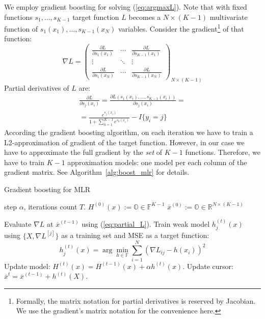 \documentclass{article}
\begin{document}
We employ gradient boosting for solving (\ref{eq:argmaxL}).
Note that with fixed functions $s_1,\ldots,s_{K-1}$ target function $L$ becomes a $N\times(K-1)$ multivariate function of $s_1(x_1),\ldots,s_{K-1}(x_N)$ variables. Consider the gradient\footnote{Formally, the matrix notation for partial derivatives is reserved by Jacobian. We use the gradient's matrix notation for the convenience here.} of that function:
\[
\nabla L = 
\left(
\begin{array}{ccc}
	  \frac{ \partial L }{ \partial s_{1}(x_{1}) } 
	& \cdots 
	& \frac{ \partial L }{ \partial s_{K-1}(x_{1}) } \\

	  \vdots & \ddots & \vdots\\

	  \frac{ \partial L }{ \partial s_{1}(x_{N}) } 
	& \cdots 
	& \frac{ \partial L }{ \partial s_{K-1}(x_{N}) }
\end{array}
\right)_{N \times (K-1)}
\]
Partial derivatives of $L$ are:
\begin{multline}
\frac{ \partial L }{ \partial s_{j}(x_{i}) }=
\frac{ \partial L(s_{1}(x_{i}),\dots,s_{K-1}(x_{i})) }{ \partial s_{j}(x_{i}) }= \\ =
\frac{ e^{s_{j}(x_{i})} }{ 1+\sum_{k=1}^{K-1} e^{s_{k}(x_{i})} } - I\{y_{i} = j\} \label{eq:partial_L}
\end{multline}
According the gradient boosting algorithm, on each iteration we have to train a L2-approximation of gradient of the target function. However, in our case we have to approximate the full gradient by the \emph{set} of $K-1$ functions. Therefore, we have to train $K-1$ approximation models: one  model per each column of the gradient matrix. See Algorithm~\ref{alg:boost_mlr} for details.


\begin{algorithm}[tb]
   \caption{Gradient boosting for MLR}
   \label{alg:boost_mlr}
\begin{algorithmic}
    step $\alpha$, iterations count $T$.
   \STATE $H^{(0)}(x):= \mathbb{O} \in \mathbb{F}^{K-1}$ 
   \STATE $\overline{x}^{(0)} := \mathbb{O} \in \mathbb{R}^{N \times (K-1)}$ 

   		\STATE Evaluate $\nabla L$ at $\overline{x}^{(t-1)}$ using (\ref{eq:partial_L}).
   			\STATE Train weak model $h_{j}^{(t)}(x)$ using $\{X,\nabla L^{[j]}\}$ as a training set and MSE as a target function:
   			\[
				h_{j}^{(t)}(x)=\arg\min_{h \in \mathbb{F}} \sum_{i=1}^{N}\left(\nabla L_{ij}-h(x_{i})\right)^{2}
			\]
		\ENDFOR
		\STATE Update model: $H^{(t)}(x)=H^{(t-1)}(x)+\alpha h^{(t)}(x)$.
		\STATE Update cursor: $\overline{x}^{t} = \overline{x}^{(t-1)} + h^{(t)}(X)$.
   \ENDFOR
   
\end{algorithmic}
\end{algorithm}
\end{document}
